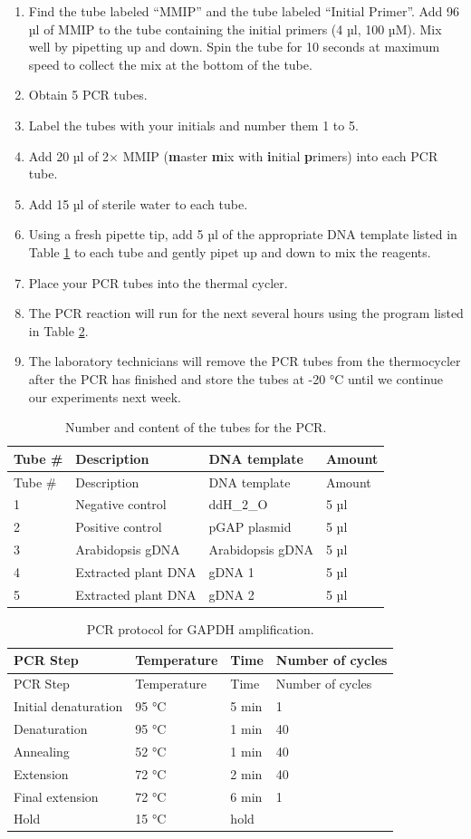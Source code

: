 \documentclass[]{book}
\providecommand{\tightlist}{%
  \setlength{\itemsep}{0pt}\setlength{\parskip}{0pt}}
\begin{document}
\begin{enumerate}
\def\labelenumi{\arabic{enumi}.}
\tightlist
\item
  Find the tube labeled ``MMIP'' and the tube labeled ``Initial Primer''. Add 96 µl of MMIP to the tube containing the initial primers (4 µl, 100 µM). Mix well by pipetting up and down. Spin the tube for 10 seconds at maximum speed to collect the mix at the bottom of the tube.\\
\item
  Obtain 5 PCR tubes.
\item
  Label the tubes with your initials and number them 1 to 5.
\item
  Add 20 µl of 2× MMIP (\textbf{m}aster \textbf{m}ix with \textbf{i}nitial \textbf{p}rimers) into each PCR tube.
\item
  Add 15 µl of sterile water to each tube.
\item
  Using a fresh pipette tip, add 5 µl of the appropriate DNA template listed in Table \ref{tab:tubes} to each tube and gently pipet up and down to mix the reagents.
\item
  Place your PCR tubes into the thermal cycler.
\item
  The PCR reaction will run for the next several hours using the program listed in Table \ref{tab:pcr}.
\item
  The laboratory technicians will remove the PCR tubes from the thermocycler after the PCR has finished and store the tubes at -20 °C until we continue our experiments next week.
\end{enumerate}

\begin{longtable}[]{@{}llll@{}}
\caption{\label{tab:tubes} Number and content of the tubes for the PCR.}\tabularnewline
\toprule
Tube \# & Description & DNA template & Amount\tabularnewline
\midrule
\endfirsthead
\toprule
Tube \# & Description & DNA template & Amount\tabularnewline
\midrule
\endhead
1 & Negative control & ddH\_2\_O & 5 µl\tabularnewline
2 & Positive control & pGAP plasmid & 5 µl\tabularnewline
3 & Arabidopsis gDNA & Arabidopsis gDNA & 5 µl\tabularnewline
4 & Extracted plant DNA & gDNA 1 & 5 µl\tabularnewline
5 & Extracted plant DNA & gDNA 2 & 5 µl\tabularnewline
\bottomrule
\end{longtable}

\begin{longtable}[]{@{}llll@{}}
\caption{\label{tab:pcr} PCR protocol for GAPDH amplification.}\tabularnewline
\toprule
PCR Step & Temperature & Time & Number of cycles\tabularnewline
\midrule
\endfirsthead
\toprule
PCR Step & Temperature & Time & Number of cycles\tabularnewline
\midrule
\endhead
Initial denaturation & 95 °C & 5 min & 1\tabularnewline
Denaturation & 95 °C & 1 min & 40\tabularnewline
Annealing & 52 °C & 1 min & 40\tabularnewline
Extension & 72 °C & 2 min & 40\tabularnewline
Final extension & 72 °C & 6 min & 1\tabularnewline
Hold & 15 °C & hold &\tabularnewline
\bottomrule
\end{longtable}
\end{document}
